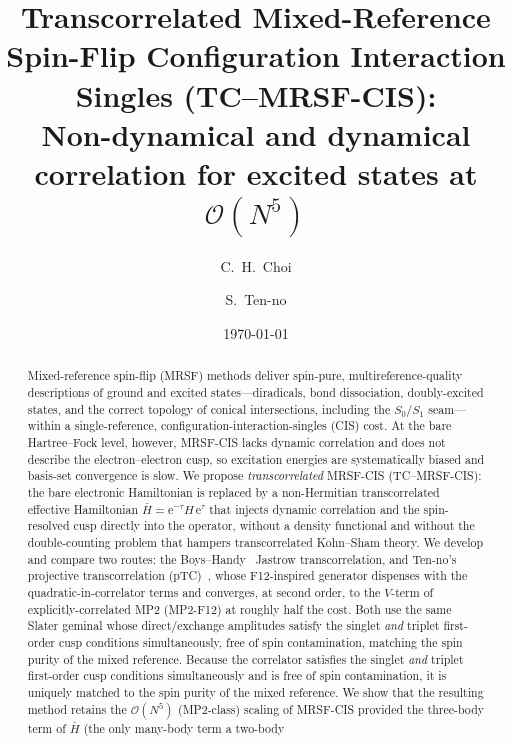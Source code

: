 \documentclass[aps,prb,reprint,superscriptaddress,floatfix]{revtex4-2}
\newcommand{\Hbar}{\bar{H}}
\newcommand{\ee}{\mathrm{e}}
\begin{document}
\title{Transcorrelated Mixed-Reference Spin-Flip
Configuration Interaction Singles (TC--MRSF-CIS):\\
Non-dynamical and dynamical correlation for excited states at
$\mathcal{O}(N^5)$}

\author{C.~H.~Choi}
\author{S.~Ten-no}

\date{\today}

\begin{abstract}
Mixed-reference spin-flip (MRSF) methods deliver spin-pure, multireference-quality
descriptions of ground and excited states---diradicals, bond dissociation,
doubly-excited states, and the correct topology of conical intersections,
including the $S_0/S_1$ seam---within a single-reference, configuration-interaction-singles
(CIS) cost. At the bare Hartree--Fock level, however, MRSF-CIS lacks dynamic
correlation and does not describe the electron--electron cusp, so excitation
energies are systematically biased and basis-set convergence is slow. We propose
\emph{transcorrelated} MRSF-CIS (TC--MRSF-CIS): the bare electronic Hamiltonian is
replaced by a non-Hermitian transcorrelated effective Hamiltonian
$\Hbar=\ee^{-\tau}H\,\ee^{\tau}$ that injects dynamic correlation and the
spin-resolved cusp directly into the operator, without a density functional and
without the double-counting problem that hampers transcorrelated Kohn--Sham theory.
We develop and compare two routes: the Boys--Handy~\cite{boys1969} Jastrow
transcorrelation, and Ten-no's projective transcorrelation
(pTC)~\cite{tenno2000,tenno2023}, whose F12-inspired generator dispenses with the
quadratic-in-correlator terms and converges, at second order, to the $V$-term of
explicitly-correlated MP2 (MP2-F12) at roughly half the cost. Both use the same
Slater geminal whose direct/exchange amplitudes satisfy the singlet \emph{and}
triplet first-order cusp conditions simultaneously, free of spin contamination,
matching the spin purity of the mixed reference. Because the correlator satisfies the singlet \emph{and} triplet
first-order cusp conditions simultaneously and is free of spin contamination, it
is uniquely matched to the spin purity of the mixed reference. We show that the
resulting method retains the $\mathcal{O}(N^5)$ (MP2-class) scaling of MRSF-CIS
provided the three-body term of $\Hbar$ (the only many-body term a two-body

\end{abstract}
\end{document}
